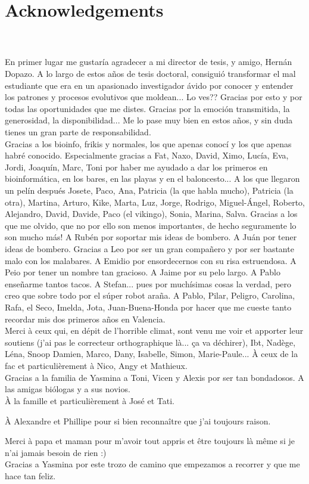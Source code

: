 \chapter*{Acknowledgements}
\thispagestyle{empty}
{\small
\verb| |\\
\verb| |\\
En primer lugar me gustaría agradecer a mi director de tesis, y amigo, Hernán Dopazo. A lo largo de estos años de tesis doctoral, consiguió transformar el mal estudiante que era en un apasionado investigador ávido por conocer y entender los patrones y procesos evolutivos que moldean... Lo ves?? Gracias por esto y por todas las oportunidades que me distes. Gracias por la emoción transmitida, la generosidad, la disponibilidad... Me lo pase muy bien en estos años, y sin duda tienes un gran parte de responsabilidad.
\verb| |\\

Gracias a los bioinfo, frikis y normales, los que apenas conocí y los que apenas habré conocido. Especialmente gracias a Fat, Naxo, David, Ximo, Lucía, Eva, Jordi, Joaquín, Marc, Toni por haber me ayudado a dar los primeros en bioinformática, en los bares, en las playas y en el baloncesto... A los que llegaron un pelín después Josete, Paco, Ana, Patricia (la que habla mucho), Patricia (la otra), Martina, Arturo, Kike, Marta, Luz, Jorge, Rodrigo, Miguel-Ángel, Roberto, Alejandro, David, Davide, Paco (el vikingo), Sonia, Marina, Salva. Gracias a los que me olvido, que no por ello son menos importantes, de hecho seguramente lo son mucho más! A Rubén por soportar mis ideas de bombero. A Juán por tener ideas de bombero. Gracias a Leo por ser un gran compañero y por ser bastante malo con los malabares. A Emidio por ensordecernos con su risa estruendosa. A Peio por tener un nombre tan gracioso. A Jaime por su pelo largo. A Pablo enseñarme tantos tacos. A Stefan... pues por muchísimas cosas la verdad, pero creo que sobre todo por el súper robot araña. A Pablo, Pilar, Peligro, Carolina, Rafa, el Seco, Imelda, Jota, Juan-Buena-Honda por hacer que me cueste tanto recordar mis dos primeros años en Valencia.
\verb| |\\

Merci à ceux qui, en dépit de l'horrible climat, sont venu me voir et apporter leur soutiens (j'ai pas le correcteur orthographique là... ça va déchirer), Ibt, Nadège, Léna, Snoop Damien, Marco, Dany, Isabelle, Simon, Marie-Paule... À ceux de la fac et particulièrement à Nico, Angy et Mathieux.
\verb| |\\

Gracias a la familia de Yasmina a Toni, Vicen y Alexis por ser tan bondadosos. A las amigas biólogas y a sus novios.
\verb| |\\

À la famille et particulièrement à José et Tati.

À Alexandre et Phillipe pour si bien reconnaître que j'ai toujours raison.

Merci à papa et maman pour m'avoir tout appris et être toujours là même si je n'ai jamais besoin de rien :)
\verb| |\\

Gracias a Yasmina por este trozo de camino que empezamos a recorrer y que me hace tan feliz.
}
